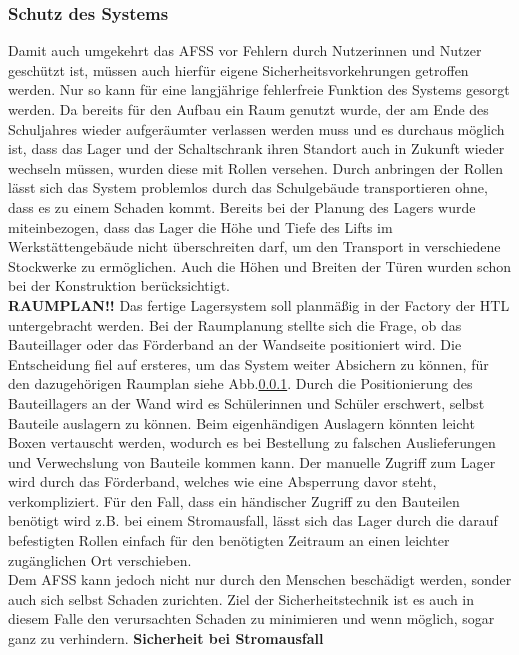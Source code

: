 \subsubsection{Schutz des Systems}
Damit auch umgekehrt das AFSS vor Fehlern durch Nutzerinnen und Nutzer geschützt ist, müssen auch hierfür eigene Sicherheitsvorkehrungen getroffen werden. Nur so kann für eine langjährige fehlerfreie Funktion des Systems gesorgt werden.
Da bereits für den Aufbau ein Raum genutzt wurde, der am Ende des Schuljahres wieder aufgeräumter verlassen werden muss und es durchaus möglich ist, dass das Lager und der Schaltschrank ihren Standort auch in Zukunft wieder wechseln müssen, wurden diese mit Rollen versehen. Durch anbringen der Rollen lässt sich das System problemlos durch das Schulgebäude transportieren ohne, dass es zu einem Schaden kommt. Bereits bei der Planung des Lagers wurde miteinbezogen, dass das Lager die Höhe und Tiefe des Lifts im Werkstättengebäude nicht überschreiten darf, um den Transport in verschiedene Stockwerke zu ermöglichen. Auch die Höhen und Breiten der Türen wurden schon bei der Konstruktion berücksichtigt.\\
\textbf{RAUMPLAN!!}
Das fertige Lagersystem soll planmäßig in der Factory der HTL untergebracht werden. Bei der Raumplanung stellte sich die Frage, ob das Bauteillager oder das Förderband an der Wandseite positioniert wird. Die Entscheidung fiel auf ersteres, um das System weiter Absichern zu können, für den dazugehörigen Raumplan siehe Abb.\ref{}. Durch die Positionierung des Bauteillagers an der Wand wird es Schülerinnen und Schüler erschwert, selbst Bauteile auslagern zu können. Beim eigenhändigen Auslagern könnten leicht Boxen vertauscht werden, wodurch es bei Bestellung zu falschen Auslieferungen und Verwechslung von Bauteile kommen kann. Der manuelle Zugriff zum Lager wird durch das Förderband, welches wie eine Absperrung davor steht, verkompliziert. Für den Fall, dass ein händischer Zugriff zu den Bauteilen benötigt wird z.B. bei einem Stromausfall, lässt sich das Lager durch die darauf befestigten Rollen einfach für den benötigten Zeitraum an einen leichter zugänglichen Ort verschieben.\\
Dem AFSS kann jedoch nicht nur durch den Menschen beschädigt werden, sonder auch sich selbst Schaden zurichten. Ziel der Sicherheitstechnik ist es auch in diesem Falle den verursachten Schaden zu minimieren und wenn möglich, sogar ganz zu verhindern.
\textbf{Sicherheit bei Stromausfall}